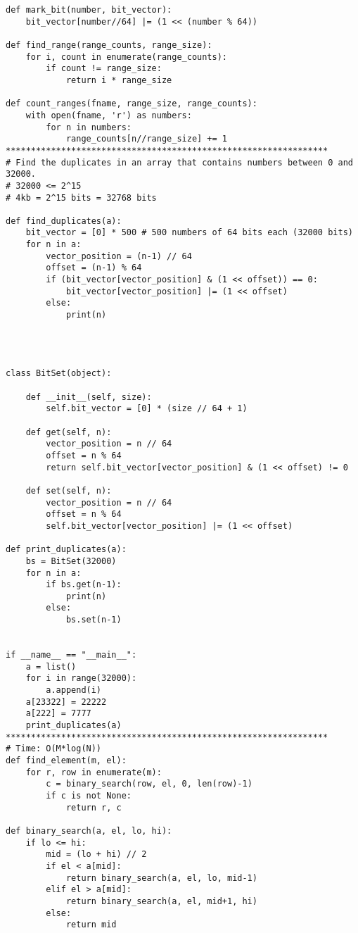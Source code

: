 \documentclass[12pt]{article}
\begin{document}
\begin{lstlisting}
def mark_bit(number, bit_vector):
    bit_vector[number//64] |= (1 << (number % 64))

def find_range(range_counts, range_size):
    for i, count in enumerate(range_counts):
        if count != range_size:
            return i * range_size

def count_ranges(fname, range_size, range_counts):
    with open(fname, 'r') as numbers:
        for n in numbers:
            range_counts[n//range_size] += 1
****************************************************************
# Find the duplicates in an array that contains numbers between 0 and 32000.
# 32000 <= 2^15
# 4kb = 2^15 bits = 32768 bits

def find_duplicates(a):
    bit_vector = [0] * 500 # 500 numbers of 64 bits each (32000 bits)
    for n in a:
        vector_position = (n-1) // 64
        offset = (n-1) % 64
        if (bit_vector[vector_position] & (1 << offset)) == 0:
            bit_vector[vector_position] |= (1 << offset)
        else:
            print(n)
            



class BitSet(object):

    def __init__(self, size):
        self.bit_vector = [0] * (size // 64 + 1)

    def get(self, n):
        vector_position = n // 64
        offset = n % 64
        return self.bit_vector[vector_position] & (1 << offset) != 0

    def set(self, n):
        vector_position = n // 64
        offset = n % 64
        self.bit_vector[vector_position] |= (1 << offset)

def print_duplicates(a):
    bs = BitSet(32000)
    for n in a:
        if bs.get(n-1):
            print(n)
        else:
            bs.set(n-1)


if __name__ == "__main__":
    a = list()
    for i in range(32000):
        a.append(i)
    a[23322] = 22222
    a[222] = 7777
    print_duplicates(a)
****************************************************************
# Time: O(M*log(N))
def find_element(m, el):
    for r, row in enumerate(m):
        c = binary_search(row, el, 0, len(row)-1)
        if c is not None:
            return r, c

def binary_search(a, el, lo, hi):
    if lo <= hi:
        mid = (lo + hi) // 2
        if el < a[mid]:
            return binary_search(a, el, lo, mid-1)
        elif el > a[mid]:
            return binary_search(a, el, mid+1, hi)
        else:
            return mid


\end{lstlisting}
\end{document}
